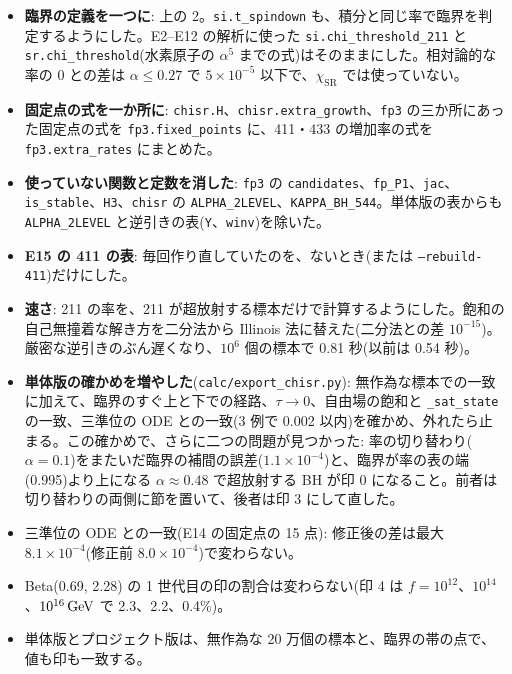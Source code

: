\begin{itemize}
\item \textbf{臨界の定義を一つに}: 上の 2。\texttt{si.t\_spindown} も、積分と同じ率で臨界を判定するようにした。E2--E12 の解析に使った \texttt{si.chi\_threshold\_211} と \texttt{sr.chi\_threshold}(水素原子の $\alpha^5$ までの式)はそのままにした。相対論的な率の 0 との差は $\alpha\le0.27$ で $5\times10^{-5}$ 以下で、$\chi_\mathrm{SR}$ では使っていない。
\item \textbf{固定点の式を一か所に}: \texttt{chisr.H}、\texttt{chisr.extra\_growth}、\texttt{fp3} の三か所にあった固定点の式を \texttt{fp3.fixed\_points} に、411・433 の増加率の式を \texttt{fp3.extra\_rates} にまとめた。
\item \textbf{使っていない関数と定数を消した}: \texttt{fp3} の \texttt{candidates}、\texttt{fp\_P1}、\texttt{jac}、\texttt{is\_stable}、\texttt{H3}、\texttt{chisr} の \texttt{ALPHA\_2LEVEL}、\texttt{KAPPA\_BH\_544}。単体版の表からも \texttt{ALPHA\_2LEVEL} と逆引きの表(\texttt{Y}、\texttt{winv})を除いた。
\item \textbf{E15 の 411 の表}: 毎回作り直していたのを、ないとき(または \texttt{--rebuild-411})だけにした。
\item \textbf{速さ}: 211 の率を、211 が超放射する標本だけで計算するようにした。飽和の自己無撞着な解き方を二分法から Illinois 法に替えた(二分法との差 $10^{-15}$)。厳密な逆引きのぶん遅くなり、$10^6$ 個の標本で 0.81 秒(以前は 0.54 秒)。
\item \textbf{単体版の確かめを増やした}(\texttt{calc/export\_chisr.py}): 無作為な標本での一致に加えて、臨界のすぐ上と下での経路、$\tau\to0$、自由場の飽和と \texttt{\_sat\_state} の一致、三準位の ODE との一致(3 例で 0.002 以内)を確かめ、外れたら止まる。この確かめで、さらに二つの問題が見つかった: 率の切り替わり($\alpha=0.1$)をまたいだ臨界の補間の誤差($1.1\times10^{-4}$)と、臨界が率の表の端(0.995)より上になる $\alpha\approx0.48$ で超放射する BH が印 0 になること。前者は切り替わりの両側に節を置いて、後者は印 3 にして直した。
\end{itemize}

\begin{result}
\begin{itemize}
\item 三準位の ODE との一致(E14 の固定点の 15 点): 修正後の差は最大 $8.1\times10^{-4}$(修正前 $8.0\times10^{-4}$)で変わらない。
\item Beta(0.69, 2.28) の 1 世代目の印の割合は変わらない(印 4 は $f=10^{12}$、$10^{14}$、$10^{16}\,\mathrm{GeV}$ で 2.3、2.2、0.4\%)。
\item 単体版とプロジェクト版は、無作為な 20 万個の標本と、臨界の帯の点で、値も印も一致する。
\end{itemize}
\end{result}
